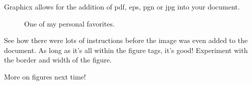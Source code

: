 \documentclass[12pt]{article} %
\begin{document}
Graphicx allows for the addition of pdf, eps, pgn or jpg into your document.

\begin{figure}
\centering  %
\label{fig:scarybird}
\setlength\fboxsep{1pt} %
\setlength\fboxrule{3pt} %
\caption{One of my personal favorites.}  %
\end{figure}

See how there were lots of instructions before the image was even added to the document.  As long as it's all within the figure tags, it's good!  Experiment with the border and width of the figure.

\begin{center}
More on figures next time!
\end{center}
\end{document}
